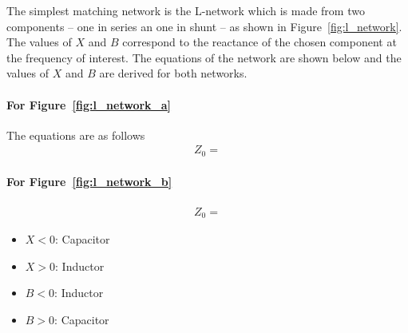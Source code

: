 The simplest matching network is the L-network which is made from two components -- one in series an one in shunt -- as shown in Figure~\ref{fig:l_network}. The values of $X$ and $B$ correspond to the reactance of the chosen component at the frequency of interest. The equations of the network are shown below and the values of $X$ and $B$ are derived for both networks.

\paragraph{For Figure~\ref{fig:l_network_a}}
The equations are as follows
\begin{align*}
    Z_0 = 
\end{align*}

\paragraph{For Figure~\ref{fig:l_network_b}}
\begin{align*}
    Z_0 = 
\end{align*}

\begin{itemize}
\item $X < 0$: Capacitor
\item $X > 0$: Inductor
\item $B < 0$: Inductor
\item $B > 0$: Capacitor
\end{itemize}




